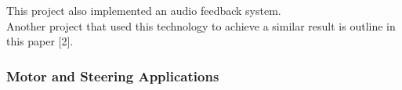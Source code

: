 \noindent This project also implemented an audio feedback system. \\

\noindent Another project that used this technology to achieve a similar result is outline in this paper [2]. \\



\subsubsection{Motor and Steering Applications} 

